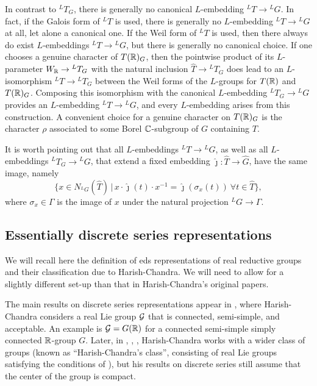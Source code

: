 \documentclass{article}
\theoremstyle{definition}
\numberwithin{equation}{section}
\renewcommand{\-}{\hyp{}}
\begin{document}
In contrast to $^LT_G$, there is generally no canonical $L$\-embedding $^LT \to {^LG}$. In fact, if the Galois form of $^LT$ is used, there is generally no $L$\-embedding $^LT \to {^LG}$ at all, let alone a canonical one. If the Weil form of $^LT$ is used, then there always do exist $L$\-embeddings $^LT \to {^LG}$, but there is generally no canonical choice. If one chooses a genuine character of $T(\mathbb{R})_G$, then the pointwise product of its $L$\-parameter $W_{\mathbb{R}} \to {^LT_G}$ with the natural inclusion $\hat T \to {^LT_G}$ does lead to an $L$\-isomorphism $^LT \to {^LT_G}$ between the Weil forms of the $L$\-groups for $T(\mathbb{R})$ and $T(\mathbb{R})_G$. Composing this isomorphism with the canonical $L$\-embedding $^LT_G \to {^LG}$ provides an $L$\-embedding $^LT \to {^LG}$, and every $L$\-embedding arises from this construction. A convenient choice for a genuine character on $T(\mathbb{R})_G$ is the character $\rho$ associated to some Borel $\mathbb{C}$-subgroup of $G$ containing $T$.

It is worth pointing out that all $L$\-embeddings $^LT \to {^LG}$, as well as all $L$\-embeddings $^LT_G \to {^LG}$, that extend a fixed embedding $\hat\jmath : \hat T \to \hat G$, have the same image, namely
\begin{equation} \label{eq:lembim}
\{x \in N_{^LG}(\hat T)\,|\, x\cdot\hat\jmath(t)\cdot x^{-1} = \hat\jmath(\sigma_x(t))\ \forall t \in \hat T\},
\end{equation}
where $\sigma_x \in \Gamma$ is the image of $x$ under the natural projection $^LG \to \Gamma$.


\subsection{Essentially discrete series representations} \label{sub:essds}

We will recall here the definition of eds representations of real reductive groups and their classification due to Harish-Chandra. We will need to allow for a slightly different set-up than that in Harish-Chandra's original papers.

The main results on discrete series representations appear in \cite{HCDSI}, where Harish-Chandra considers a real Lie group $\mathcal{G}$ that is connected, semi-simple, and acceptable. An example is $\mathcal{G}=G(\mathbb{R})$ for a connected semi-simple simply connected $\mathbb{R}$-group $G$. Later, in \cite{HC-R1}, \cite{HC-R2}, \cite{HC-R3}, Harish-Chandra works with a wider class of groups (known as ``Harish-Chandra's class'', consisting of real Lie groups satisfying the conditions of \cite[\S3]{HC-R1}), but his results on discrete series still assume that the center of the group is compact. 
\end{document}
